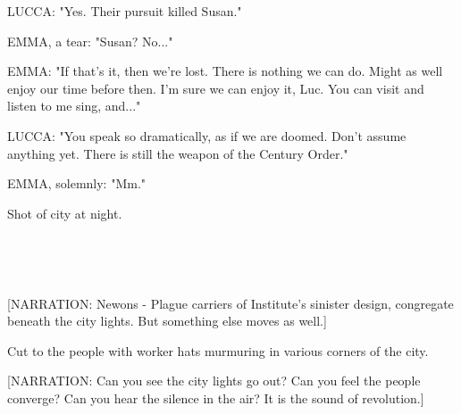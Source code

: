 \documentclass[11pt]{article}
\begin{document}
LUCCA: "Yes. Their pursuit killed Susan."

EMMA, a tear: "Susan? No..."

EMMA: "If that's it, then we're lost.
There is nothing we can do.
Might as well enjoy our time before then.
I'm sure we can enjoy it, Luc.
You can visit and listen to me sing, and..."

LUCCA: "You speak so dramatically, as if we are doomed.
Don't assume anything yet. 
There is still the weapon of the Century Order."

EMMA, solemnly: "Mm."

Shot of city at night.

\ 

\ 

[NARRATION: Newons - Plague carriers of Institute's sinister design, congregate beneath the city lights. 
But something else moves as well.]

Cut to the people with worker hats murmuring in various corners of the city.

[NARRATION: Can you see the city lights go out?
Can you feel the people converge?
Can you hear the silence in the air?
It is the sound of revolution.]
\end{document}
